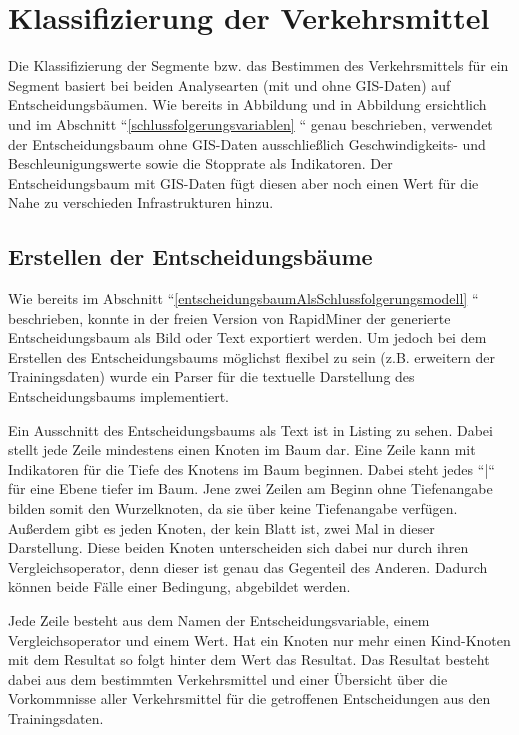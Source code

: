 \section{Klassifizierung der Verkehrsmittel}
Die Klassifizierung der Segmente bzw. das Bestimmen des Verkehrsmittels für ein Segment basiert bei beiden Analysearten (mit und ohne GIS-Daten) auf Entscheidungsbäumen. Wie bereits in Abbildung  und in Abbildung  ersichtlich und im Abschnitt ``\ref{schlussfolgerungsvariablen} `` genau beschrieben, verwendet der Entscheidungsbaum ohne GIS-Daten ausschließlich Geschwindigkeits- und Beschleunigungswerte sowie die Stopprate als Indikatoren. Der Entscheidungsbaum mit GIS-Daten fügt diesen aber noch einen Wert für die Nahe zu verschieden Infrastrukturen hinzu.

\subsection{Erstellen der Entscheidungsbäume}
\label{entscheidungsbaumGenerierungPHP}
Wie bereits im Abschnitt ``\ref{entscheidungsbaumAlsSchlussfolgerungsmodell} `` beschrieben, konnte in der freien Version von RapidMiner der generierte Entscheidungsbaum als Bild oder Text exportiert werden. Um jedoch bei dem Erstellen des Entscheidungsbaums möglichst flexibel zu sein (z.B. erweitern der Trainingsdaten) wurde ein Parser für die textuelle Darstellung des Entscheidungsbaums implementiert. 

Ein Ausschnitt des Entscheidungsbaums als Text ist in Listing  zu sehen. Dabei stellt jede Zeile mindestens einen Knoten im Baum dar. Eine Zeile kann mit Indikatoren für die Tiefe des Knotens im Baum beginnen. Dabei steht jedes ``|`` für eine Ebene tiefer im Baum. Jene zwei Zeilen am Beginn ohne Tiefenangabe bilden somit den Wurzelknoten, da sie über keine Tiefenangabe verfügen. Außerdem gibt es jeden Knoten, der kein Blatt ist, zwei Mal in dieser Darstellung. Diese beiden Knoten unterscheiden sich dabei nur durch ihren Vergleichsoperator, denn dieser ist genau das Gegenteil des Anderen. Dadurch können beide Fälle einer Bedingung, abgebildet werden.

Jede Zeile besteht aus dem Namen der Entscheidungsvariable, einem Vergleichsoperator und einem Wert. Hat ein Knoten nur mehr einen Kind-Knoten mit dem Resultat so folgt hinter dem Wert das Resultat. Das Resultat besteht dabei aus dem bestimmten Verkehrsmittel und einer Übersicht über die Vorkommnisse aller Verkehrsmittel für die getroffenen Entscheidungen aus den Trainingsdaten.

